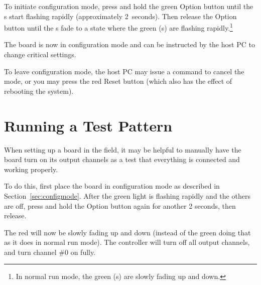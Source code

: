 \documentclass[letterpaper,twoside,onecolumn,openright,final]{memoir}
\begin{document}
To initiate configuration mode, press and hold the green Option button until the s start
flashing rapidly (approximately 2~seconds).  Then release the Option button until the s
fade to a state where the green (s) are flashing rapidly.\footnote{In normal run mode,
the green (s) are slowly fading up and down.}

The board is now in configuration mode and can be instructed by the host PC to change critical
settings.

To leave configuration mode, the host PC may issue a command to cancel the mode, or you may press
the red Reset button (which also has the effect of rebooting the system).

\section{Running a Test Pattern}
When setting up a board in the field, it may be helpful to manually have the board turn on its
output channels as a test that everything is connected and working properly.

To do this, first place the board in configuration mode as described in Section~\ref{sec:configmode}.
After the green light is flashing rapidly and the others are off, press and hold the Option button
again %
for another 2 seconds, then release.

The red  will now be slowly fading up and down (instead of the green  doing that
as it does in normal run mode).  The controller will turn off all output channels, and turn channel \#0
on fully.  
\end{document}
